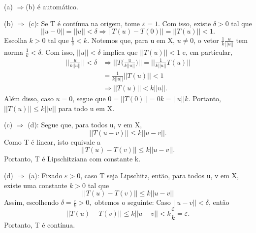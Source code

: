 \documentclass[metric_notes.tex]{subfiles}
\begin{document}
\begin{proof*}
	(a) \(\Rightarrow \)(b) é automático.

	(b) \(\Rightarrow \) (c): Se T é contínua na origem, tome \(\varepsilon = 1.\) Com isso, existe \(\delta > 0\) tal que
	\[
		||u-0|| = ||u|| < \delta \Rightarrow ||T(u)-T(0)|| = ||T(u)|| < 1.
	\]
	Escolha \(k > 0\) tal que \(\frac{1}{\delta } < k.\) Notemos que, para u em X, \(u\neq0\), o vetor
	\(\frac{1}{k}\frac{u}{||u||}\) tem norma \(\frac{1}{k} < \delta .\) Com isso, \(||u|| < \delta \) implica que
	\(||T(u)|| < 1\) e, em particular,
	\begin{align*}
		\biggl|\biggl|\frac{u}{k||u||}\biggr|\biggr| < \delta & \Rightarrow \biggl|\biggl|T \biggl(\frac{u}{k||u||}\biggr)\biggr|\biggr| = \biggl|\biggl|\frac{1}{k||u||}T(u)\biggr|\biggr| \\
		                                                      & = \frac{1}{k||u||}||T(u)|| < 1                                                                                              \\
		                                                      & \Rightarrow ||T(u)|| < k||u||.
	\end{align*}
	Além disso, caso \(u=0\), segue que \(0 = ||T(0)|| = 0k = ||u||k.\) Portanto, \(||T(u)||\leq k||u||\) para todo u em X.

	(c) \(\Rightarrow \) (d): Segue que, para todos u, v em X,
	\[
		||T(u-v)||\leq k||u-v||.
	\]
	Como T é linear, isto equivale a
	\[
		||T(u)-T(v)||\leq k||u-v||.
	\]
	Portanto, T é Lipschitziana com constante k.

	(d) \(\Rightarrow \) (a): Fixado \(\varepsilon > 0\), caso T seja Lipschitz, então, para todos u, v em X, existe uma constante \(k > 0\) tal que
	\[
		||T(u) - T(v)||\leq  k ||u-v||
	\]
	Assim, escolhendo \(\delta  = \frac{\varepsilon }{k} > 0,\) obtemos o seguinte: Caso \(||u-v|| < \delta \), então
	\[
		||T(u)-T(v)||\leq k||u-v|| < k \frac{\varepsilon }{k} = \varepsilon .
	\]
	Portanto, T é contínua. \qedsymbol

\end{proof*}
\end{document}
